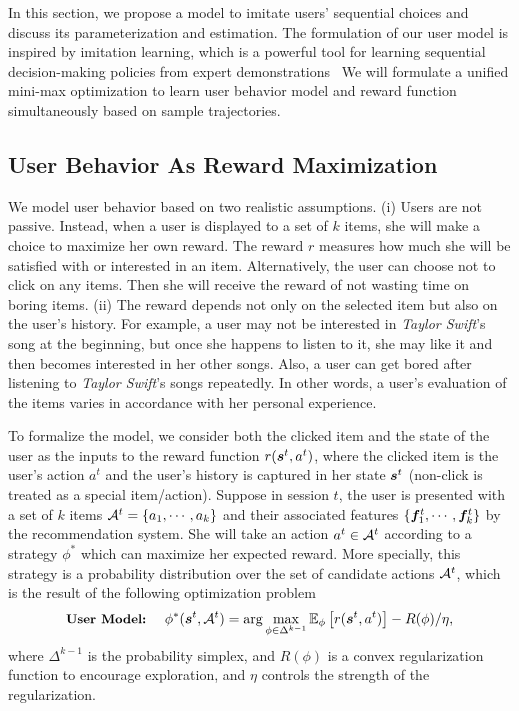 \documentclass{article} %
\begin{document}
In this section, we propose a model to imitate users' sequential choices and discuss its parameterization and estimation. The formulation of our user model is inspired by imitation learning, which is a powerful tool for learning sequential decision-making policies from expert demonstrations~\citep{Abbeel2004ApprenticeshipLV,Ho2016ModelFreeIL,Ho2016GenerativeAI,Torabi2018BehavioralCF}
We will formulate a unified mini-max optimization to learn user behavior model and reward function simultaneously based on sample trajectories. 

\vspace{-3mm}
\subsection{User Behavior As Reward Maximization}\label{sec:user_model}
\vspace{-3mm}
We model user behavior based on two realistic assumptions. (i) Users are not passive. Instead, when a user is displayed to a set of $k$ items, she will make a choice to maximize her own reward. The reward $r$ measures how much she will be satisfied with or interested in an item. Alternatively, the user can choose not to click on any items. Then she will receive the reward of not wasting time on boring items. (ii) The reward depends not only on the selected item but also on the user's history. For example, a user may not be interested in {\it Taylor Swift}'s song at the beginning, but once she happens to listen to it, she may like it and then becomes interested in her other songs. Also, a user can get bored after listening to {\it Taylor Swift}'s songs repeatedly. In other words, a user's evaluation of the items varies in accordance with her personal experience.

To formalize the model, we consider both the clicked item and the state of the user as the inputs to the reward function $r({\bm{s}}^t, a^t)$, where the clicked item is the user's action $a^t$ and the user's history is captured in her state ${\bm{s}}^t$ (non-click is treated as a special item/action). Suppose in session $t$, the user is presented with a set of $k$ items ${\mathcal{A}}^t = \{a_1, \cdots, a_k \}$ and their associated features $\{{\bm{f}}^t_1,\cdots, {\bm{f}}^t_k\}$ by the recommendation system. She will take an action $a^t \in {\mathcal{A}}^t$ according to a strategy $\phi^*$ which can maximize her expected reward. More specially, this strategy is a probability distribution over the set of candidate actions ${\mathcal{A}}^t$, which is the result of the following optimization problem
\begin{equation}\label{eq:max}
    \textbf{\small User Model:}~~~~\phi^*(\vs^t,\gA^t) = \arg\max_{\phi \in \Delta^{k-1}} \E_{\phi} \left[r(\vs^t, a^t) \right] -R(\phi)/\eta,
\vspace{-1.2mm}
\end{equation}
where {\small$\Delta^{k-1}$} is the probability simplex, and $R(\phi)$ is a convex regularization function to encourage exploration, and $\eta$ controls the strength of the regularization. 
\end{document}
